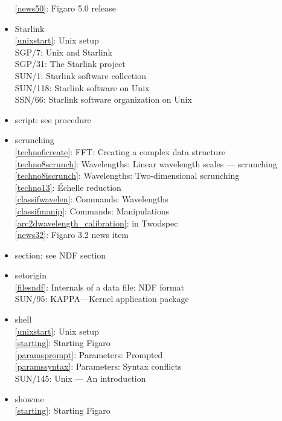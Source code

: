\documentclass[11pt,twoside]{article}
\newcommand{\htmlref}[2]{#1}
\newcommand{\xref}[3]{#1}
\newcommand{\idxint}[2]{\ref{#1}: \htmlref{#2}{#1}}
\newcommand{\idxint}[2]{\htmlref{#2}{#1}}
\newcommand{\latorhtm}[2]{#1}
\newcommand{\latorhtm}[2]{#2}
\begin{document}
\begin{itemize}
   \idxint{news50}{Figaro 5.0 release}
\item Starlink\\
   \idxint{unixstart}{Unix setup}\\
   \xref{SGP/7: Unix and Starlink}{sgp7}{}\\
   \xref{SGP/31: The Starlink project}{sgp31}{}\\
   \xref{SUN/1: Starlink software collection}{sun1}{}\\
   \xref{SUN/118: Starlink software on Unix}{sun118}{}\\
   \xref{SSN/66: Starlink software organization on Unix}{ssn66}{}
\item script: see procedure
\item scrunching\\
   \idxint{techno6create}{FFT: Creating a complex data structure}\\
   \idxint{techno8scrunch}{Wavelengths: Linear wavelength scales
                           \latorhtm{---}{-} scrunching}\\
   \idxint{techno8iscrunch}{Wavelengths: Two-dimensional scrun\-ching}\\
   \idxint{techno13}{\'Echelle reduction}\\
   \idxint{classifwavelen}{Commands: Wavelengths}\\
   \idxint{classifmanip}{Commands: Manipulations}\\
   \idxint{arc2dwavelength_calibration}{in Twodspec}\\
   \idxint{news32}{Figaro 3.2 news item}
\item section: see NDF section
\item setorigin\\
   \idxint{filesndf}{Internals of a data file: NDF format}\\
   \xref{SUN/95: KAPPA\latorhtm{---}{-}Kernel application package}{sun95}{SETORIGIN}
\item shell\\
   \idxint{unixstart}{Unix setup}\\
   \idxint{starting}{Starting Figaro}\\
   \idxint{paramsprompt}{Parameters: Prompted}\\
   \idxint{paramssyntax}{Parameters: Syntax conflicts}\\
   \xref{SUN/145: Unix \latorhtm{---}{-} An introduction}{sun145}{}
\item showme\\
   \idxint{starting}{Starting Figaro}\\

\end{itemize}
\end{document}
